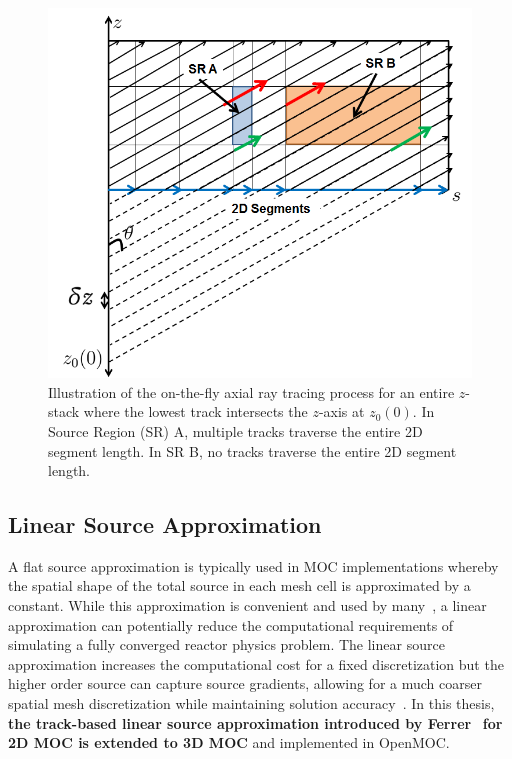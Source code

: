 \documentclass[12pt,twoside]{mitthesis-exec}
\begin{document}
\begin{figure}[ht!]
	\centering
	\includegraphics[width=0.75\linewidth]{figures/ph2016/stack_tracing.png}
	\caption{Illustration of the on-the-fly axial ray tracing process for an entire $z$-stack where the lowest track intersects the $z$-axis at $z_0(0)$. In Source Region (SR) A, multiple tracks traverse the entire 2D segment length. In SR B, no tracks traverse the entire 2D segment length.}
	\label{fig::stack_tracing}
\end{figure}


\newpage
\subsection*{Linear Source Approximation}

A flat source approximation is typically used in MOC implementations whereby the spatial shape of the total source in each mesh cell is approximated by a constant. While this approximation is convenient and used by many~\cite{kochunas, liu_mrt, dragon_3d_moc, apollo3_vv, cactus_3d, mockingbird}, a linear approximation can potentially reduce the computational requirements of simulating a fully converged reactor physics problem. The linear source approximation increases the computational cost for a fixed discretization but the higher order source can capture source gradients, allowing for a much coarser spatial mesh discretization while maintaining solution accuracy~\cite{ferrer2012linear}. In this thesis, \textbf{the track-based linear source approximation introduced by Ferrer}~\cite{ferrer2015linear} \textbf{for 2D MOC is extended to 3D MOC} and implemented in OpenMOC.


\end{document}
